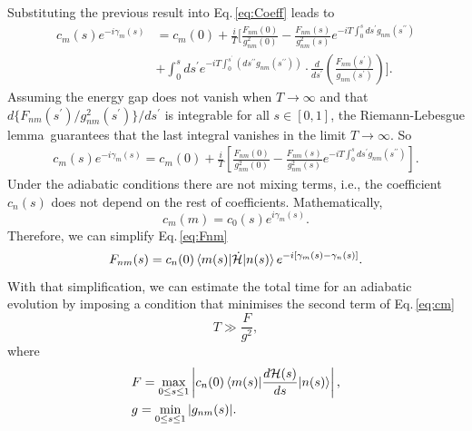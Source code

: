  Substituting the previous result into Eq.\,\eqref{eq:Coeff} leads to
 \begin{equation}
 \begin{split}
      c_{m}(s)e^{-i\gamma_{m}(s)} & = c_{m}(0) + \frac{i}{T}\Biggr[\frac{F_{nm}(0)}{g^{2}_{nm}(0)} - \frac{F_{nm}(s)}{g^{2}_{nm}(s)}e^{-iT\int_{0}^{s}ds^{\prime}g_{nm}(s^{\prime \prime})} \\
      & + \int_{0}^{s}ds^{\prime} e^{-iT\int_{0}^{s^{\prime}}\left(ds^{\prime \prime}g_{nm}(s^{\prime\prime}) \right)} \cdot \frac{d}{ds^{\prime}}\left(\frac{F_{nm}(s^{\prime})}{g_{nm}(s^{\prime})}\right)\Biggr].
\end{split}
\end{equation}
 Assuming the energy gap does not vanish when $T \rightarrow \infty$ and that $d\{F_{nm}(s^{\prime})/g_{nm}^{2}(s^{\prime})\}/ds^{\prime}$ is integrable for all $s \in [0,1]$, the Riemann-Lebesgue lemma\,\cite{BrownChurchill} guarantees that the last integral vanishes in the limit $T \rightarrow \infty$. So
  \begin{align}
  \label{eq:cm}
     c_{m}(s)e^{-i\gamma_{m}(s)} = c_{m}(0) + \frac{i}{T}\left[\frac{F_{nm}(0)}{g^{2}_{nm}(0)} - \frac{F_{nm}(s)}{g^{2}_{nm}(s)}e^{-iT\int_{0}^{s}ds^{\prime}g_{nm}(s^{\prime \prime})}\right].
 \end{align}
 Under the adiabatic conditions there are not mixing terms, i.e., the coefficient $c_{n}(s)$ does not depend on the rest of coefficients. Mathematically,
\begin{equation}
    c_{m}(m) = c_{0}(s)e^{i\gamma_{m}(s)}.
\end{equation}
Therefore, we can simplify Eq.\,\eqref{eq:Fnm}
\begin{equation}
    F_{nm}(s) = c_{n}(0)\braket{m(s)|\dot{\mathcal{H}}|n(s)} e^{-i\left[\gamma_{m}(s) - \gamma_{n}(s)\right]}.
\end{equation}
 With that simplification, we can estimate the total time for an adiabatic evolution by imposing a condition that minimises the second term of Eq.\,\eqref{eq:cm}
 \begin{equation}
     T \gg \frac{F}{g^{2}},
 \end{equation}
 where
 \begin{align}
     &F = \max_{0 \leq s \leq 1} \left|c_{n}(0)\braket{m(s)|\frac{d\mathcal{H}(s)}{ds}| n(s)}\right|, \\
     &g = \min_{0 \leq s \leq 1} |g_{nm}(s)|.
 \end{align}
